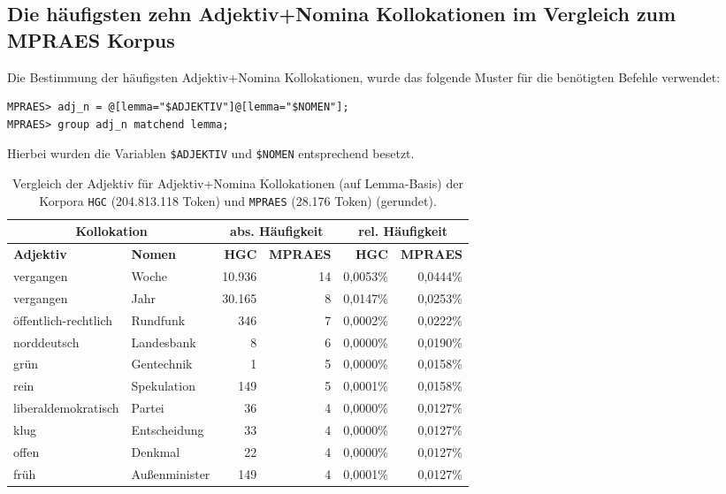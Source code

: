 \documentclass[%
	type=document,%
  	style=article,%
  	media=print,
  	pages=oneside,%
  	prefixLecturer=Dozenten:,
  	author=multiple,
]{unihildesheim} %
\begin{document}
\subsection{Die häufigsten zehn Adjektiv+Nomina Kollokationen im Vergleich zum
MPRAES Korpus}
Die Bestimmung der häufigsten Adjektiv+Nomina Kollokationen, wurde das folgende
Muster für die benötigten Befehle verwendet:
\begin{Verbatim}[frame=single,label=CQP,commandchars=\\\{\}]
MPRAES> adj_n = @[lemma="$ADJEKTIV"]@[lemma="$NOMEN"];
MPRAES> group adj_n matchend lemma;
\end{Verbatim}
Hierbei wurden die Variablen \texttt{\$ADJEKTIV} und \texttt{\$NOMEN}
entsprechend  besetzt.
\begin{table}[!hpb]\label{t}
	\center
	\begin{tabularx}{\textwidth}{llrrrr}
		\toprule
		\multicolumn{2}{c}{\textbf{Kollokation}} & \multicolumn{2}{c}{\textbf{abs.
		Häufigkeit}} & \multicolumn{2}{c}{\textbf{rel. Häufigkeit}} \\
		\midrule
		\textbf{Adjektiv} & \textbf{Nomen} & \textbf{HGC} & \textbf{MPRAES}
		&	\textbf{HGC} & \textbf{MPRAES} \\
		\midrule
		vergangen & Woche & 10.936 & 14 & 0,0053\% & 0,0444\%\\
		vergangen & Jahr & 30.165 & 8 & 0,0147\% & 0,0253\%\\
		öffentlich-rechtlich & Rundfunk & 346 & 7 & 0,0002\% & 0,0222\%\\
		norddeutsch & Landesbank & 8 & 6 & 0,0000\% & 0,0190\%\\
		grün & Gentechnik & 1 & 5 & 0,0000\% & 0,0158\%\\
		rein & Spekulation & 149 & 5 & 0,0001\% & 0,0158\%\\
		liberaldemokratisch & Partei & 36 & 4 & 0,0000\% & 0,0127\%\\
		klug & Entscheidung & 33 & 4 & 0,0000\% & 0,0127\%\\
		offen & Denkmal & 22 & 4 & 0,0000\% & 0,0127\%\\
		früh & Außenminister & 149 & 4 & 0,0001\% & 0,0127\%\\
		\bottomrule
	\end{tabularx}
	\caption{Vergleich der Adjektiv für Adjektiv+Nomina Kollokationen (auf
	Lemma-Basis) der Korpora \texttt{HGC} (204.813.118 Token) und \texttt{MPRAES} (28.176 Token)
	 (gerundet).}
	\label{tab:compare_adj_n}
\end{table}
\end{document}
